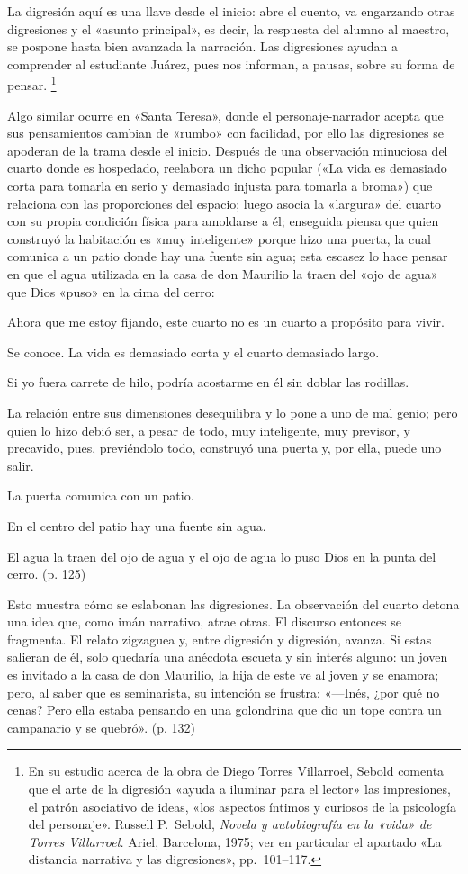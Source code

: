 \documentclass[14pt,twoside,final]{extbook} %
\let\oldfootnote\footnote
\renewcommand\footnote[1]{%
\oldfootnote{\hspace{1mm}#1}}
\begin{document}
La digresión aquí es una llave desde el inicio: abre el cuento, va engarzando otras digresiones y el «asunto principal», es decir, la respuesta del alumno al maestro, se pospone hasta bien avanzada la
narración. Las digresiones ayudan a comprender al estudiante Juárez, pues nos informan, a pausas, sobre su forma de pensar.\footnote{En su estudio acerca de la obra de Diego Torres Villarroel, Sebold comenta que el arte de la digresión «ayuda a iluminar para el lector» las impresiones, el patrón asociativo de ideas, «los aspectos íntimos y curiosos de la psicología del personaje». Russell P.~Sebold, \emph{Novela y autobiografía en la «vida» de Torres Villarroel.} Ariel, Barcelona, 1975; ver en particular el apartado «La distancia narrativa y las digresiones», pp.~101--117.}

Algo similar ocurre en «Santa Teresa», donde el personaje-narrador acepta que sus pensamientos cambian de «rumbo» con facilidad, por ello las digresiones se apoderan de la trama desde el inicio. Después de una observación minuciosa del cuarto donde es hospedado, reelabora un dicho popular («La vida es demasiado corta para tomarla en serio y demasiado injusta para tomarla a broma») que relaciona con las proporciones del espacio; luego asocia la «largura» del cuarto con su propia condición física para amoldarse a él; enseguida piensa que quien construyó la habitación es «muy inteligente» porque hizo una puerta, la cual comunica a un patio donde hay una fuente sin agua; esta escasez lo hace pensar en que el agua utilizada en la casa de don Maurilio la traen del «ojo de agua» que Dios «puso» en la cima del cerro:
\begin{quoting}
Ahora que me estoy fijando, este cuarto no es un cuarto a propósito para vivir.

Se conoce. La vida es demasiado corta y el cuarto demasiado largo.

Si yo fuera carrete de hilo, podría acostarme en él sin doblar las rodillas.

La relación entre sus dimensiones desequilibra y lo pone a uno de mal genio; pero quien lo hizo debió ser, a pesar de todo, muy inteligente, muy previsor, y precavido, pues, previéndolo todo, construyó una puerta y, por ella, puede uno salir.

La puerta comunica con un patio.

En el centro del patio hay una fuente sin agua.

El agua la traen del ojo de agua y el ojo de agua lo puso Dios en la punta del cerro. (p. 125)
\end{quoting}
Esto muestra cómo se eslabonan las digresiones. La observación del cuarto detona una idea que, como imán narrativo, atrae otras. El discurso entonces se fragmenta. El relato zigzaguea y, entre digresión y digresión, avanza. Si estas salieran de él, solo quedaría una anécdota escueta y sin interés alguno: un joven es invitado a la casa de don Maurilio, la hija de este ve al joven y se enamora; pero, al saber que es seminarista, su intención se frustra: «---Inés, ¿por qué no cenas? Pero ella estaba pensando en una golondrina que dio un tope contra un campanario y se quebró». (p. 132)
\end{document}
